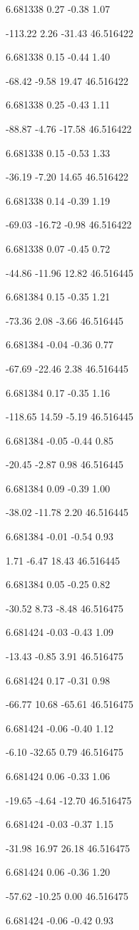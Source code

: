 6.681338
0.27
-0.38
1.07

-113.22
2.26
-31.43
46.516422

6.681338
0.15
-0.44
1.40

-68.42
-9.58
19.47
46.516422

6.681338
0.25
-0.43
1.11

-88.87
-4.76
-17.58
46.516422

6.681338
0.15
-0.53
1.33

-36.19
-7.20
14.65
46.516422

6.681338
0.14
-0.39
1.19

-69.03
-16.72
-0.98
46.516422

6.681338
0.07
-0.45
0.72

-44.86
-11.96
12.82
46.516445

6.681384
0.15
-0.35
1.21

-73.36
2.08
-3.66
46.516445

6.681384
-0.04
-0.36
0.77

-67.69
-22.46
2.38
46.516445

6.681384
0.17
-0.35
1.16

-118.65
14.59
-5.19
46.516445

6.681384
-0.05
-0.44
0.85

-20.45
-2.87
0.98
46.516445

6.681384
0.09
-0.39
1.00

-38.02
-11.78
2.20
46.516445

6.681384
-0.01
-0.54
0.93

1.71
-6.47
18.43
46.516445

6.681384
0.05
-0.25
0.82

-30.52
8.73
-8.48
46.516475

6.681424
-0.03
-0.43
1.09

-13.43
-0.85
3.91
46.516475

6.681424
0.17
-0.31
0.98

-66.77
10.68
-65.61
46.516475

6.681424
-0.06
-0.40
1.12

-6.10
-32.65
0.79
46.516475

6.681424
0.06
-0.33
1.06

-19.65
-4.64
-12.70
46.516475

6.681424
-0.03
-0.37
1.15

-31.98
16.97
26.18
46.516475

6.681424
0.06
-0.36
1.20

-57.62
-10.25
0.00
46.516475

6.681424
-0.06
-0.42
0.93

